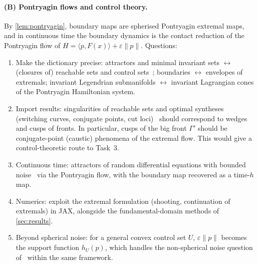 \documentclass[11pt,a4paper]{article}
\theoremstyle{definition}
\theoremstyle{remark}
\newcommand{\eps}{\varepsilon}
\begin{document}
\paragraph{(B) Pontryagin flows and control theory.} By \cref{lem:pontryagin}, boundary maps are spherised
Pontryagin extremal maps, and in continuous time the boundary dynamics is the contact reduction of the Pontryagin
flow of $H=\langle p,F(x)\rangle+\eps\|p\|$. Questions:
\begin{enumerate}[label=(B\arabic*),leftmargin=*]
  \item Make the dictionary precise: attractors and minimal invariant sets $\leftrightarrow$ (closures of) reachable sets
  and control sets~\cite{CK00}; boundaries $\leftrightarrow$ envelopes of extremals; invariant Legendrian submanifolds
  $\leftrightarrow$ invariant Lagrangian cones of the Pontryagin Hamiltonian system.
  \item Import results: singularities of reachable sets and optimal syntheses (switching curves, conjugate points,
  cut loci)~\cite{AS04} should correspond to wedges and cusps of fronts. In particular, cusps of the big front
  $\Gamma'$ should be conjugate-point (caustic) phenomena of the extremal flow. This would give a control-theoretic
  route to Task~3.
  \item Continuous time: attractors of random differential equations with bounded noise~\cite{HY10} via the
  Pontryagin flow, with the boundary map recovered as a time-$h$ map.
  \item Numerics: exploit the extremal formulation (shooting, continuation of extremals) in JAX, alongside the
  fundamental-domain methods of \cref{sec:results}.
  \item Beyond spherical noise: for a general convex control set $U$, $\eps\|p\|$ becomes the support function $h_U(p)$,
  which handles the non-spherical noise question of~\cite{LRT23} within the same framework.
\end{enumerate}
\end{document}
